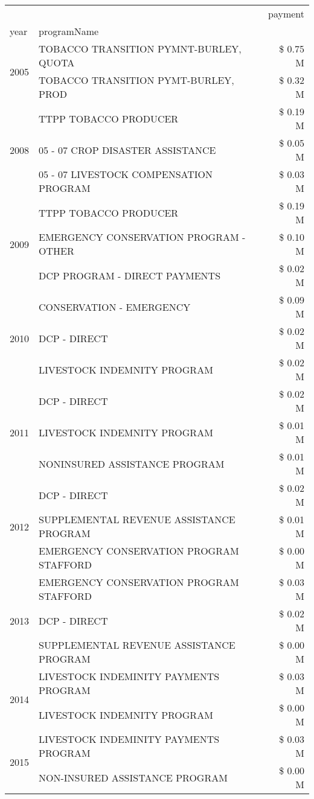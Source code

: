 \begin{tabular}{llr}
\toprule
 &  & payment \\
year & programName &  \\
\midrule
\multirow[t]{2}{*}{2005} & TOBACCO TRANSITION PYMNT-BURLEY, QUOTA & \$ 0.75 M \\
 & TOBACCO TRANSITION PYMT-BURLEY, PROD & \$ 0.32 M \\
\cline{1-3}
\multirow[t]{3}{*}{2008} & TTPP TOBACCO PRODUCER & \$ 0.19 M \\
 & 05 - 07 CROP DISASTER ASSISTANCE & \$ 0.05 M \\
 & 05 - 07 LIVESTOCK COMPENSATION PROGRAM & \$ 0.03 M \\
\cline{1-3}
\multirow[t]{3}{*}{2009} & TTPP TOBACCO PRODUCER & \$ 0.19 M \\
 & EMERGENCY CONSERVATION PROGRAM - OTHER & \$ 0.10 M \\
 & DCP PROGRAM - DIRECT PAYMENTS & \$ 0.02 M \\
\cline{1-3}
\multirow[t]{3}{*}{2010} & CONSERVATION - EMERGENCY & \$ 0.09 M \\
 & DCP - DIRECT & \$ 0.02 M \\
 & LIVESTOCK INDEMNITY PROGRAM & \$ 0.02 M \\
\cline{1-3}
\multirow[t]{3}{*}{2011} & DCP - DIRECT & \$ 0.02 M \\
 & LIVESTOCK INDEMNITY PROGRAM & \$ 0.01 M \\
 & NONINSURED ASSISTANCE PROGRAM & \$ 0.01 M \\
\cline{1-3}
\multirow[t]{3}{*}{2012} & DCP - DIRECT & \$ 0.02 M \\
 & SUPPLEMENTAL REVENUE ASSISTANCE PROGRAM & \$ 0.01 M \\
 & EMERGENCY CONSERVATION PROGRAM STAFFORD & \$ 0.00 M \\
\cline{1-3}
\multirow[t]{3}{*}{2013} & EMERGENCY CONSERVATION PROGRAM STAFFORD & \$ 0.03 M \\
 & DCP - DIRECT & \$ 0.02 M \\
 & SUPPLEMENTAL REVENUE ASSISTANCE PROGRAM & \$ 0.00 M \\
\cline{1-3}
\multirow[t]{2}{*}{2014} & LIVESTOCK INDEMINITY PAYMENTS PROGRAM & \$ 0.03 M \\
 & LIVESTOCK INDEMNITY PROGRAM & \$ 0.00 M \\
\cline{1-3}
\multirow[t]{3}{*}{2015} & LIVESTOCK INDEMINITY PAYMENTS PROGRAM & \$ 0.03 M \\
 & NON-INSURED ASSISTANCE PROGRAM & \$ 0.00 M \\

\end{tabular}
